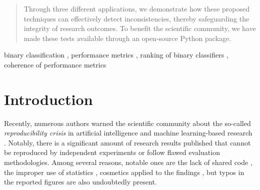 \documentclass[5p, final]{elsarticle}
\begin{document}
\begin{frontmatter}
\begin{abstract}
Through three different applications, we demonstrate how these proposed techniques can effectively detect inconsistencies, thereby safeguarding the integrity of research outcomes. To benefit the scientific community, we have made these tests available through an open-source Python package.






\end{abstract}

\begin{keyword}
binary classification
\sep 
performance metrics
\sep
ranking of binary classifiers
\sep 
coherence of performance metrics
\end{keyword}


\end{frontmatter}

        


\section{Introduction}\label{section:Introduction}


Recently, numerous authors warned the scientific community about the so-called \emph{reproducibility crisis} in artificial intelligence and machine learning-based research \cite{leakage, reprcrisis, repr0, repr1}. Notably, there is a significant amount of research results published that cannot be reproduced by independent experiments or follow flawed evaluation methodologies. Among several reasons, notable ones are the lack of shared code \cite{leakage}, the improper use of statistics \cite{leakage, staterrors}, cosmetics applied to the findings \cite{fabrication}, but typos in the reported figures are also undoubtedly present.
\end{document}
